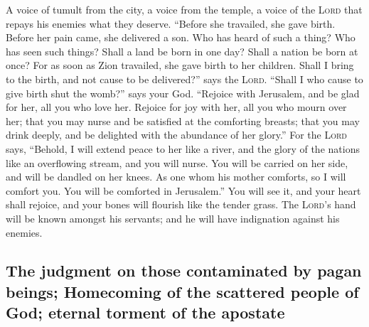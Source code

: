  A voice of tumult from the city, a voice from the temple,
a voice of the \textsc{Lord} that repays his enemies what they deserve.
 ``Before she travailed, she gave birth. Before her pain
came, she delivered a son.  Who has heard of such a thing?
Who has seen such things? Shall a land be born in one day? Shall a
nation be born at once? For as soon as Zion travailed, she gave birth to
her children.  Shall I bring to the birth, and not cause
to be delivered?'' says the \textsc{Lord}. ``Shall I who cause to give
birth shut the womb?'' says your God.  ``Rejoice with
Jerusalem, and be glad for her, all you who love her. Rejoice for joy
with her, all you who mourn over her;  that you may nurse
and be satisfied at the comforting breasts; that you may drink deeply,
and be delighted with the abundance of her glory.''  For
the \textsc{Lord} says, ``Behold, I will extend peace to her like a
river, and the glory of the nations like an overflowing stream, and you
will nurse. You will be carried on her side, and will be dandled on her
knees.  As one whom his mother comforts, so I will
comfort you. You will be comforted in Jerusalem.''  You
will see it, and your heart shall rejoice, and your bones will flourish
like the tender grass. The \textsc{Lord}'s hand will be known amongst
his servants; and he will have indignation against his enemies.

\hypertarget{the-judgment-on-those-contaminated-by-pagan-beings-homecoming-of-the-scattered-people-of-god-eternal-torment-of-the-apostate}{%
\subsection{The judgment on those contaminated by pagan beings;
Homecoming of the scattered people of God; eternal torment of the
apostate}\label{the-judgment-on-those-contaminated-by-pagan-beings-homecoming-of-the-scattered-people-of-god-eternal-torment-of-the-apostate}}

